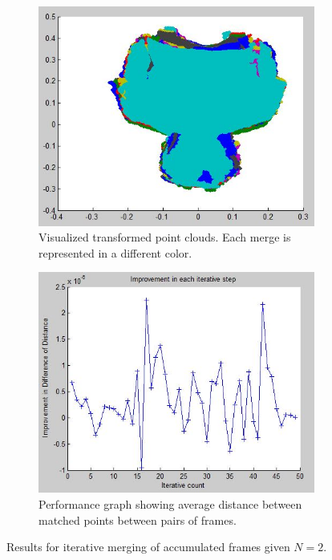 \documentclass[11pt]{article}
\begin{document}
\begin{figure}[h] \centering
	\begin{subfigure}{.5\textwidth} 
		\includegraphics[width=.9\textwidth]{img/iterative_2.jpg}
		\caption{Visualized transformed point clouds. Each merge is represented in a different color.}
		\label{fig:iterative_2}
	\end{subfigure}%
	\begin{subfigure}{.5\textwidth} 
		\includegraphics[width=.9\textwidth]{img/iterative_2_performance.jpg}
		\caption{Performance graph showing average distance between matched points between pairs of frames.}
		\label{fig:iterative_2_performance}
	\end{subfigure}
	\caption{Results for iterative merging of accumulated frames given $N = 2$.}
\end{figure}
\end{document}
